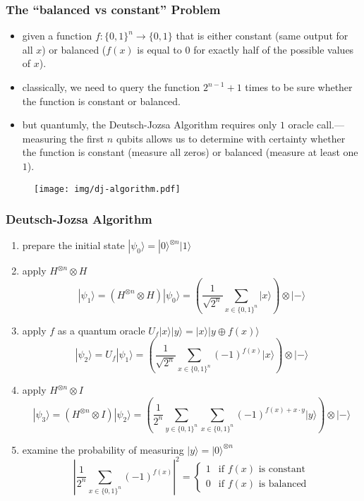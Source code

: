 \documentclass[UTF8,11pt,colorlinks,compress,openany]{beamer}%
\begin{document}
\begin{frame}\frametitle{The ``balanced vs constant'' Problem}
	\begin{itemize}
		\item given a function $f:\{0,1\}^n\to\{0,1\}$ that is either constant (same output for all $x$) or balanced ($f(x)$ is equal to $0$ for exactly half of the possible values of $x$).
		\item classically, we need to query the function $2^{n-1}+1$ times to be sure whether the function is constant or balanced.
		\item but quantumly, the Deutsch-Jozsa Algorithm requires only $1$ oracle call.---measuring the first $n$ qubits allows us to determine with certainty whether the function is constant (measure all zeros) or balanced (measure at least one $1$).
	\end{itemize}
\begin{figure}[H]
\texttt{[image: img/dj-algorithm.pdf]}
\end{figure}
\end{frame}

\begin{frame}\frametitle{Deutsch-Jozsa Algorithm}
\setlength\abovedisplayskip{0pt}
\setlength\belowdisplayskip{0pt}
	\begin{enumerate}
		\item prepare the initial state $|\psi_0\rangle=|0\rangle^{\otimes n}|1\rangle$
		\item apply $H^{\otimes n}\otimes H$
		\[|\psi_1\rangle=\left(H^{\otimes n}\otimes H\right)|\psi_0\rangle=\left(\frac{1}{\sqrt{2^n}}\sum\limits_{x\in\{0,1\}^n}|x\rangle\right)\otimes|-\rangle\]
		\item apply $f$ as a quantum oracle $U_f|x\rangle |y\rangle=|x\rangle |y\oplus f(x)\rangle$
		\[|\psi_2\rangle=U_f|\psi_1\rangle=\left(\frac{1}{\sqrt{2^n}}\sum\limits_{x\in\{0,1\}^n}(-1)^{f(x)}|x\rangle\right)\otimes|-\rangle\]
		\item apply $H^{\otimes n}\otimes I$
		\[|\psi_3\rangle=\left(H^{\otimes n}\otimes I\right)|\psi_2\rangle=\left(\frac{1}{2^n}\sum\limits_{y\in\{0,1\}^n}\sum\limits_{x\in\{0,1\}^n}(-1)^{f(x)+x\cdot y}|y\rangle\right)\otimes|-\rangle\]
		\item examine the probability of measuring $|y\rangle=|0\rangle^{\otimes n}$
		\[\left|\frac{1}{2^n}\sum\limits_{x\in\{0,1\}^n}(-1)^{f(x)}\right|^2=
		\begin{cases}
			1&\mbox{if $f(x)$ is constant}\\
			0&\mbox{if $f(x)$ is balanced}
		\end{cases}\]
	\end{enumerate}
\end{frame}
\end{document}
